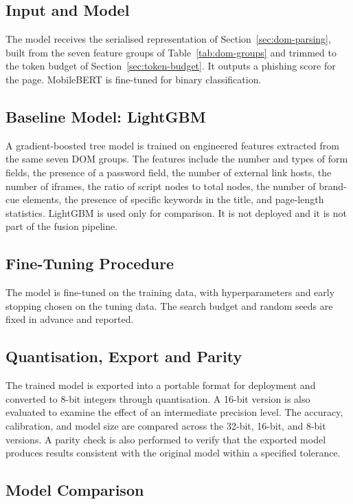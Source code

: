 \documentclass{FastFyp}
\begin{document}
\subsection{Input and Model}
The model receives the serialised representation of Section~\ref{sec:dom-parsing}, built from the seven feature groups of Table~\ref{tab:dom-groups} and trimmed to the token budget of Section~\ref{sec:token-budget}. It outputs a phishing score for the page. MobileBERT is fine-tuned for binary classification.

\subsection{Baseline Model: LightGBM}
A gradient-boosted tree model is trained on engineered features extracted from the same seven DOM groups. The features include the number and types of form fields, the presence of a password field, the number of external link hosts, the number of iframes, the ratio of script nodes to total nodes, the number of brand-cue elements, the presence of specific keywords in the title, and page-length statistics. LightGBM is used only for comparison. It is not deployed and it is not part of the fusion pipeline.

\subsection{Fine-Tuning Procedure}
The model is fine-tuned on the training data, with hyperparameters and early stopping chosen on the tuning data. The search budget and random seeds are fixed in advance and reported.

\subsection{Quantisation, Export and Parity}

The trained model is exported into a portable format for deployment and converted to 8-bit integers through quantisation. A 16-bit version is also evaluated to examine the effect of an intermediate precision level. The accuracy, calibration, and model size are compared across the 32-bit, 16-bit, and 8-bit versions. A parity check is also performed to verify that the exported model produces results consistent with the original model within a specified tolerance.

\subsection{Model Comparison}
\end{document}
